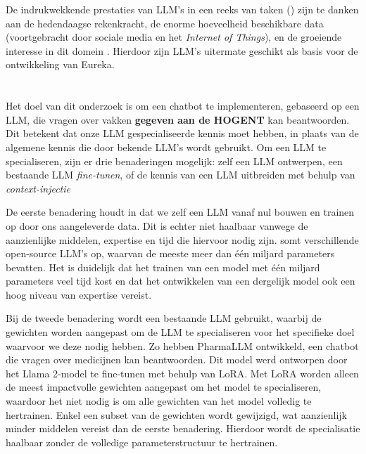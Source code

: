 De indrukwekkende prestaties van LLM's in een reeks van taken (\autocite{Naveed2023}) zijn te danken aan de hedendaagse rekenkracht, de e\-nor\-me hoeveelheid beschikbare data (voortgebracht door sociale media en het \textit{Internet of Things}), en de groeiende interesse in dit domein \autocite{Zohuri2022, Naveed2023}. Hierdoor zijn LLM's uitermate geschikt als basis voor de ontwikkeling van Eureka. 

\section{}%
\label{sec:ontwerp}

\subsection{}%
\label{subsec:specialiseren_llm}

Het doel van dit onderzoek is om een chatbot te implementeren, gebaseerd op een LLM, die vragen over vakken \textbf{gegeven aan de HOGENT} kan beantwoorden. Dit betekent dat onze LLM gespecialiseerde kennis moet hebben, in plaats van de algemene kennis die door bekende LLM's wordt gebruikt. Om een LLM te specialiseren, zijn er drie benaderingen mogelijk: zelf een LLM ontwerpen, een bestaande LLM \textit{fine-tunen}, of de kennis van een LLM uitbreiden met behulp van \textit{context-injectie}

De eerste benadering houdt in dat we zelf een LLM vanaf nul bouwen en trainen op door ons aangeleverde data. Dit is echter niet haalbaar vanwege de aanzienlijke middelen, expertise \autocite{Naveed2023} en tijd die hiervoor nodig zijn. \textcite{Fourrier2024} somt verschillende open-source LLM's op, waarvan de meeste meer dan één miljard parameters bevatten. Het is duidelijk dat het trainen van een model met één miljard parameters veel tijd kost en dat het ontwikkelen van een dergelijk model ook een hoog niveau van expertise vereist.

Bij de tweede benadering wordt een bestaande LLM gebruikt, waarbij de gewichten worden aangepast om de LLM te specialiseren voor het specifieke doel waarvoor we deze nodig hebben. Zo hebben \textcite{Azam2024} PharmaLLM ontwikkeld, een chatbot die vragen over medicijnen kan beantwoorden. Dit model werd ontworpen door het Llama 2-model te fine-tunen met behulp van \acrfull{LoRA}. Met LoRA worden alleen de meest impactvolle gewichten aangepast om het model te specialiseren, waardoor het niet nodig is om alle gewichten van het model volledig te hertrainen. Enkel een subset van de gewichten wordt gewijzigd, wat aanzienlijk minder middelen vereist dan de eerste benadering. Hierdoor wordt de specialisatie haalbaar zonder de volledige parameterstructuur te hertrainen.


